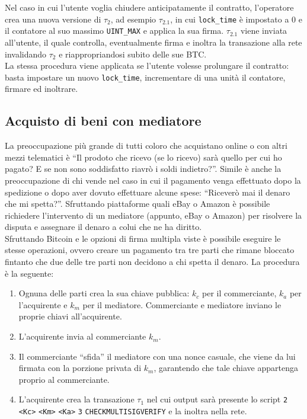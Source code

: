 Nel caso in cui l'utente voglia chiudere anticipatamente il contratto, l'operatore crea una nuova versione di $\tau_2$, ad esempio $\tau_{2.1}$, in cui \verb|lock_time| è impostato a 0 e il contatore al suo massimo \verb|UINT_MAX| e applica la sua firma. $\tau_{2.1}$ viene inviata all'utente, il quale controlla, eventualmente firma e inoltra la transazione alla rete invalidando $\tau_2$ e riappropriandosi subito delle sue BTC.\\
La stessa procedura viene applicata se l'utente volesse prolungare il contratto: basta impostare un nuovo \verb|lock_time|, incrementare di una unità il contatore, firmare ed inoltrare.

\subsection{Acquisto di beni con mediatore}

La preoccupazione più grande di tutti coloro che acquistano online o con altri mezzi telematici è ``Il prodoto che ricevo (se lo ricevo) sarà quello per cui ho pagato? E se non sono soddisfatto riavrò i soldi indietro?''. Simile è anche la preoccupazione di chi vende nel caso in cui il pagamento venga effettuato dopo la spedizione o dopo aver dovuto effettuare alcune spese: ``Riceverò mai il denaro che mi spetta?''. Sfruttando piattaforme quali eBay o Amazon è possibile richiedere l'intervento di un mediatore (appunto, eBay o Amazon) per risolvere la disputa e assegnare il denaro a colui che ne ha diritto.\\
Sfruttando Bitcoin e le opzioni di firma multipla viste è possibile eseguire le stesse operazioni, ovvero creare un pagamento tra tre parti che rimane bloccato fintanto che due delle tre parti non decidono a chi spetta il denaro. La procedura è la seguente:
\begin{enumerate}
    \item Ognuna delle parti crea la sua chiave pubblica: $k_c$ per il commerciante, $k_a$ per l'acquirente e $k_m$ per il mediatore. Commerciante e mediatore inviano le proprie chiavi all'acquirente.
    \item L'acquirente invia al commerciante $k_m$.
    \item Il commerciante ``sfida'' il mediatore con una nonce casuale, che viene da lui firmata con la porzione privata di $k_m$, garantendo che tale chiave appartenga proprio al commerciante.
    \item L'acquirente crea la transazione $\tau_1$ nel cui output sarà presente lo script \verb|2| \verb|<Kc>| \verb|<Km>| \verb|<Ka>| \verb|3| \verb|CHECKMULTISIGVERIFY| e la inoltra nella rete.
\end{enumerate}

